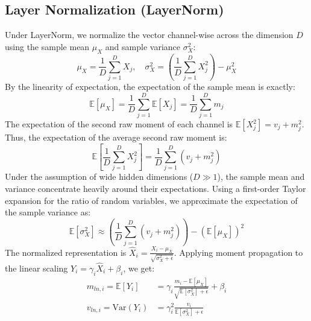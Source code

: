 \documentclass{article}
\theoremstyle{plain}
\theoremstyle{definition}
\theoremstyle{remark}
\begin{document}
\subsection{Layer Normalization (LayerNorm)}
Under LayerNorm, we normalize the vector channel-wise across the dimension $D$ using the sample mean $\mu_X$ and sample variance $\sigma_X^2$:
\begin{equation}
    \mu_X = \frac{1}{D} \sum_{j=1}^D X_j, \quad \sigma_X^2 = \left( \frac{1}{D} \sum_{j=1}^D X_j^2 \right) - \mu_X^2
\end{equation}
By the linearity of expectation, the expectation of the sample mean is exactly:
\begin{equation}
    \mathbb{E}[\mu_X] = \frac{1}{D} \sum_{j=1}^D \mathbb{E}[X_j] = \frac{1}{D} \sum_{j=1}^D m_j
\end{equation}
The expectation of the second raw moment of each channel is $\mathbb{E}[X_j^2] = v_j + m_j^2$. Thus, the expectation of the average second raw moment is:
\begin{equation}
    \mathbb{E}\left[ \frac{1}{D} \sum_{j=1}^D X_j^2 \right] = \frac{1}{D} \sum_{j=1}^D (v_j + m_j^2)
\end{equation}
Under the assumption of wide hidden dimensions ($D \gg 1$), the sample mean and variance concentrate heavily around their expectations. Using a first-order Taylor expansion for the ratio of random variables, we approximate the expectation of the sample variance as:
\begin{equation}
    \mathbb{E}[\sigma_X^2] \approx \left( \frac{1}{D} \sum_{j=1}^D (v_j + m_j^2) \right) - (\mathbb{E}[\mu_X])^2
\end{equation}
The normalized representation is $\hat{X}_i = \frac{X_i - \mu_X}{\sqrt{\sigma_X^2 + \epsilon}}$. Applying moment propagation to the linear scaling $Y_i = \gamma_i \hat{X}_i + \beta_i$, we get:
\begin{align}
    m_{ln, i} = \mathbb{E}[Y_i] &= \gamma_i \frac{m_i - \mathbb{E}[\mu_X]}{\sqrt{\mathbb{E}[\sigma_X^2] + \epsilon}} + \beta_i \\
    v_{ln, i} = \text{Var}(Y_i) &= \gamma_i^2 \frac{v_i}{\mathbb{E}[\sigma_X^2] + \epsilon}
\end{align}
\end{document}
